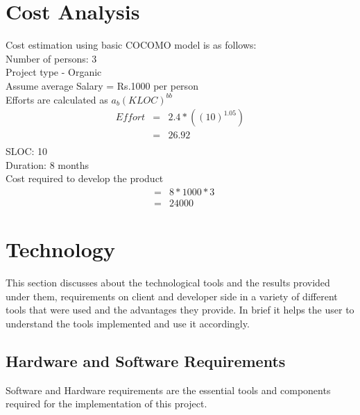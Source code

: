 \documentclass[a4paper,12pt]{report}
\begin{document}
\section{Cost Analysis}

\par Cost estimation using basic COCOMO model is as follows:\\

Number of persons: 3 \\[0.85cm]
Project type - Organic \\[0.85cm]
Assume average Salary = Rs.1000 per person \\[0.85cm]
Efforts are calculated as $a_b(KLOC)^{bb}$
\begin{eqnarray*}
Effort & = & 2.4*((10)^{1.05}) \\
       & = & 26.92 \\[0.75cm]
\end{eqnarray*}
SLOC: 10 \\[0.85cm]
Duration: 8 months \\[0.85cm]
Cost required to develop the product\begin{eqnarray*}
 & = & 8*1000*3 \\
 & = & 24000
\end{eqnarray*}


\section{Technology}

\par This section discusses about the technological tools and the results provided under them, requirements on client and developer side in a variety of different tools that were used and the advantages they provide. In brief it helps the user to understand the tools implemented and use it accordingly. \\

\subsection{Hardware and Software Requirements}
\par Software and Hardware requirements are the essential tools and components required for the implementation of this project.
\end{document}
